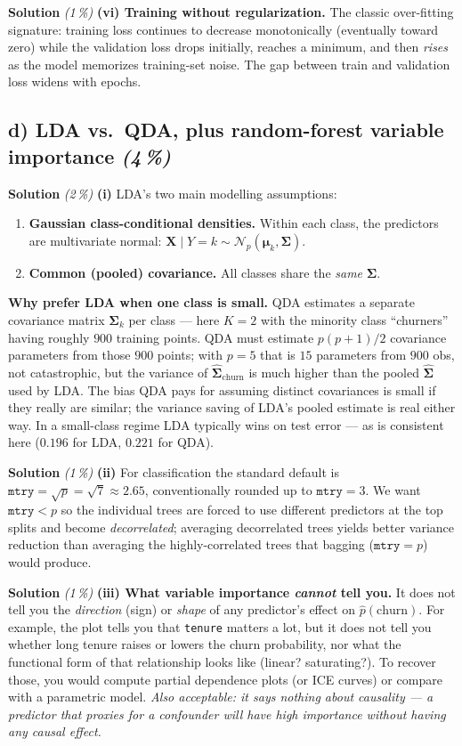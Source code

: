 \documentclass[11pt,a4paper]{article}
\newcommand{\subpoints}[1]{\textit{(#1\,\%)}}
\newcommand{\sol}{\noindent\textbf{Solution}}
\begin{document}
\medskip
\sol{} \subpoints{1} \textbf{(vi) Training without regularization.} The classic over-fitting
signature: training loss continues to decrease monotonically (eventually toward zero) while the
validation loss drops initially, reaches a minimum, and then \emph{rises} as the model memorizes
training-set noise. The gap between train and validation loss widens with epochs.

\subsection*{d) LDA vs.\ QDA, plus random-forest variable importance \subpoints{4}}

\sol{} \subpoints{2} \textbf{(i)} LDA's two main modelling assumptions:
\begin{enumerate}
  \item \textbf{Gaussian class-conditional densities.} Within each class, the predictors are
        multivariate normal: $\mathbf{X}\mid Y=k \sim \mathcal{N}_p(\boldsymbol\mu_k, \boldsymbol\Sigma)$.
  \item \textbf{Common (pooled) covariance.} All classes share the \emph{same} $\boldsymbol\Sigma$.
\end{enumerate}
\textbf{Why prefer LDA when one class is small.} QDA estimates a separate covariance matrix
$\boldsymbol\Sigma_k$ per class --- here $K=2$ with the minority class ``churners'' having
roughly $900$ training points. QDA must estimate $p(p+1)/2$ covariance parameters from those $900$
points; with $p=5$ that is $15$ parameters from $900$ obs, not catastrophic, but the variance of
$\widehat{\boldsymbol\Sigma}_{\text{churn}}$ is much higher than the pooled $\widehat{\boldsymbol\Sigma}$ used
by LDA. The bias QDA pays for assuming distinct covariances is small if they really are similar;
the variance saving of LDA's pooled estimate is real either way. In a small-class regime LDA
typically wins on test error --- as is consistent here ($0.196$ for LDA, $0.221$ for QDA).

\medskip
\sol{} \subpoints{1} \textbf{(ii)} For classification the standard default is $\mathtt{mtry}
=\sqrt{p}=\sqrt{7}\approx 2.65$, conventionally rounded up to $\mathtt{mtry}=3$. We want
$\mathtt{mtry}<p$ so the individual trees are forced to use different predictors at the top splits
and become \emph{decorrelated}; averaging decorrelated trees yields better variance reduction than
averaging the highly-correlated trees that bagging ($\mathtt{mtry}=p$) would produce.

\medskip
\sol{} \subpoints{1} \textbf{(iii) What variable importance \emph{cannot} tell you.} It does not
tell you the \emph{direction} (sign) or \emph{shape} of any predictor's effect on $\hat p(\text{churn})$.
For example, the plot tells you that \texttt{tenure} matters a lot, but it does not tell you
whether long tenure raises or lowers the churn probability, nor what the functional form of that
relationship looks like (linear? saturating?). To recover those, you would compute partial
dependence plots (or ICE curves) or compare with a parametric model. \emph{Also acceptable: it
says nothing about causality --- a predictor that proxies for a confounder will have high
importance without having any causal effect.}
\end{document}

